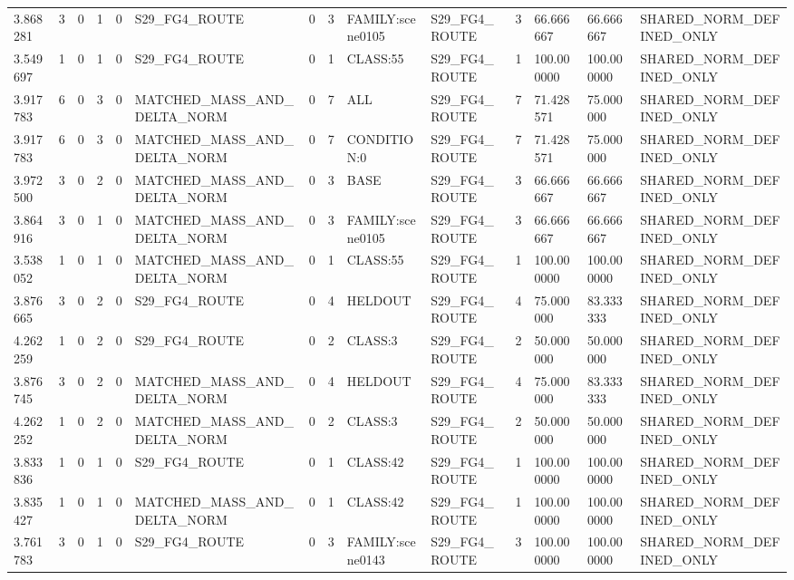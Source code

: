 \begin{tabular}{llllllllllllll}
3.868281 & 3 & 0 & 1 & 0 & S29\_FG4\_ROUTE & 0 & 3 & FAMILY:scene0105 & S29\_FG4\_ROUTE & 3 & 66.666667 & 66.666667 & SHARED\_NORM\_DEFINED\_ONLY \\
3.549697 & 1 & 0 & 1 & 0 & S29\_FG4\_ROUTE & 0 & 1 & CLASS:55 & S29\_FG4\_ROUTE & 1 & 100.000000 & 100.000000 & SHARED\_NORM\_DEFINED\_ONLY \\
3.917783 & 6 & 0 & 3 & 0 & MATCHED\_MASS\_AND\_DELTA\_NORM & 0 & 7 & ALL & S29\_FG4\_ROUTE & 7 & 71.428571 & 75.000000 & SHARED\_NORM\_DEFINED\_ONLY \\
3.917783 & 6 & 0 & 3 & 0 & MATCHED\_MASS\_AND\_DELTA\_NORM & 0 & 7 & CONDITION:0 & S29\_FG4\_ROUTE & 7 & 71.428571 & 75.000000 & SHARED\_NORM\_DEFINED\_ONLY \\
3.972500 & 3 & 0 & 2 & 0 & MATCHED\_MASS\_AND\_DELTA\_NORM & 0 & 3 & BASE & S29\_FG4\_ROUTE & 3 & 66.666667 & 66.666667 & SHARED\_NORM\_DEFINED\_ONLY \\
3.864916 & 3 & 0 & 1 & 0 & MATCHED\_MASS\_AND\_DELTA\_NORM & 0 & 3 & FAMILY:scene0105 & S29\_FG4\_ROUTE & 3 & 66.666667 & 66.666667 & SHARED\_NORM\_DEFINED\_ONLY \\
3.538052 & 1 & 0 & 1 & 0 & MATCHED\_MASS\_AND\_DELTA\_NORM & 0 & 1 & CLASS:55 & S29\_FG4\_ROUTE & 1 & 100.000000 & 100.000000 & SHARED\_NORM\_DEFINED\_ONLY \\
3.876665 & 3 & 0 & 2 & 0 & S29\_FG4\_ROUTE & 0 & 4 & HELDOUT & S29\_FG4\_ROUTE & 4 & 75.000000 & 83.333333 & SHARED\_NORM\_DEFINED\_ONLY \\
4.262259 & 1 & 0 & 2 & 0 & S29\_FG4\_ROUTE & 0 & 2 & CLASS:3 & S29\_FG4\_ROUTE & 2 & 50.000000 & 50.000000 & SHARED\_NORM\_DEFINED\_ONLY \\
3.876745 & 3 & 0 & 2 & 0 & MATCHED\_MASS\_AND\_DELTA\_NORM & 0 & 4 & HELDOUT & S29\_FG4\_ROUTE & 4 & 75.000000 & 83.333333 & SHARED\_NORM\_DEFINED\_ONLY \\
4.262252 & 1 & 0 & 2 & 0 & MATCHED\_MASS\_AND\_DELTA\_NORM & 0 & 2 & CLASS:3 & S29\_FG4\_ROUTE & 2 & 50.000000 & 50.000000 & SHARED\_NORM\_DEFINED\_ONLY \\
3.833836 & 1 & 0 & 1 & 0 & S29\_FG4\_ROUTE & 0 & 1 & CLASS:42 & S29\_FG4\_ROUTE & 1 & 100.000000 & 100.000000 & SHARED\_NORM\_DEFINED\_ONLY \\
3.835427 & 1 & 0 & 1 & 0 & MATCHED\_MASS\_AND\_DELTA\_NORM & 0 & 1 & CLASS:42 & S29\_FG4\_ROUTE & 1 & 100.000000 & 100.000000 & SHARED\_NORM\_DEFINED\_ONLY \\
3.761783 & 3 & 0 & 1 & 0 & S29\_FG4\_ROUTE & 0 & 3 & FAMILY:scene0143 & S29\_FG4\_ROUTE & 3 & 100.000000 & 100.000000 & SHARED\_NORM\_DEFINED\_ONLY \\

\end{tabular}
